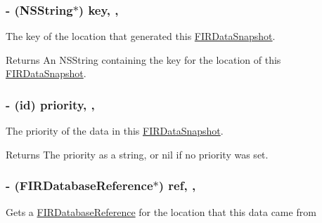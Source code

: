 \subsubsection[{key}]{\setlength{\rightskip}{0pt plus 5cm}-\/ (N\+S\+String$\ast$) key\hspace{0.3cm}{\ttfamily [read]}, {\ttfamily [nonatomic]}, {\ttfamily [strong]}}\label{interface_f_i_r_data_snapshot_a84dcc624075720e171f27b8e9ee8c678}
The key of the location that generated this \hyperlink{interface_f_i_r_data_snapshot}{F\+I\+R\+Data\+Snapshot}.

\begin{DoxyReturn}{Returns}
An N\+S\+String containing the key for the location of this \hyperlink{interface_f_i_r_data_snapshot}{F\+I\+R\+Data\+Snapshot}. 
\end{DoxyReturn}
\hypertarget{interface_f_i_r_data_snapshot_a15147ea53b4b2865f2971ce2f92ff72c}{}
\subsubsection[{priority}]{\setlength{\rightskip}{0pt plus 5cm}-\/ (id) priority\hspace{0.3cm}{\ttfamily [read]}, {\ttfamily [nonatomic]}, {\ttfamily [strong]}}\label{interface_f_i_r_data_snapshot_a15147ea53b4b2865f2971ce2f92ff72c}
The priority of the data in this \hyperlink{interface_f_i_r_data_snapshot}{F\+I\+R\+Data\+Snapshot}.

\begin{DoxyReturn}{Returns}
The priority as a string, or nil if no priority was set. 
\end{DoxyReturn}
\hypertarget{interface_f_i_r_data_snapshot_a0b0f3c17189d70f31c62b94d244e761f}{}
\subsubsection[{ref}]{\setlength{\rightskip}{0pt plus 5cm}-\/ ({\bf F\+I\+R\+Database\+Reference}$\ast$) ref\hspace{0.3cm}{\ttfamily [read]}, {\ttfamily [nonatomic]}, {\ttfamily [strong]}}\label{interface_f_i_r_data_snapshot_a0b0f3c17189d70f31c62b94d244e761f}
Gets a \hyperlink{interface_f_i_r_database_reference}{F\+I\+R\+Database\+Reference} for the location that this data came from

